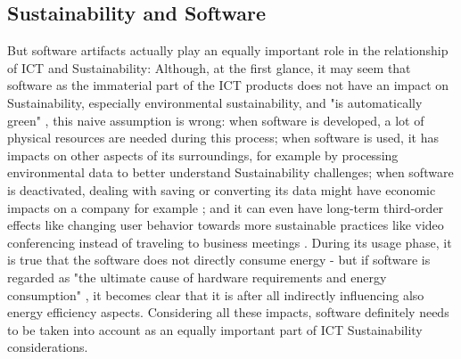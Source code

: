 \documentclass[oribibl]{llncs}
\begin{document}
\subsection{Sustainability and Software}
But software artifacts actually play an equally important role in the relationship of ICT and Sustainability: %
Although, at the first glance, it may seem that software as the immaterial %
part of the ICT products does not have an impact on Sustainability, especially environmental sustainability, and "is automatically green" \cite{agarwal_sustainable_2012}, this naive assumption is wrong: when software is developed, a lot of physical resources are needed during this process; when software is used, it has impacts on other aspects of its surroundings, for example by processing environmental data to better understand Sustainability challenges; when software is deactivated, dealing with saving or converting its data might have economic impacts on a company for example \cite{johann_sustainable_2011}; and it can even have long-term third-order effects like changing user behavior towards more sustainable practices like video conferencing instead of traveling to business meetings \cite{amsel_toward_2011}. %
During its usage phase, it is true that the software does not directly consume energy - but if software is regarded as "the ultimate cause of hardware requirements and energy consumption" \cite{kern_impacts_2015}, it becomes clear that it is after all indirectly influencing also energy efficiency aspects. Considering all these impacts, software definitely needs to be taken into account as an equally important part of ICT Sustainability considerations.
\end{document}
